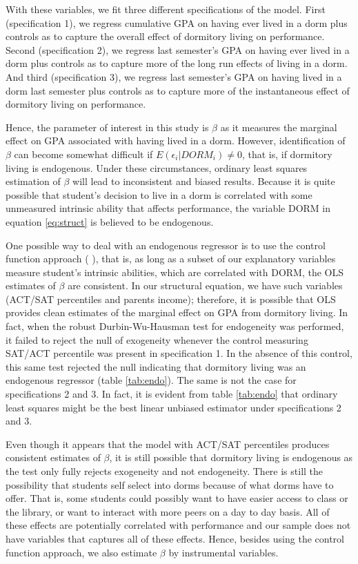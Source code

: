 \documentclass[12pt]{article}
\newcommand{\citee}[1]{\citename{#1} \citeyear{#1}}
\begin{document}
With these variables, we fit three different specifications of the model. First (specification 1), we regress cumulative GPA on having ever lived in a dorm plus controls as to capture the overall effect of dormitory living on performance. Second (specification 2), we regress last semester's GPA on having ever lived in a dorm plus controls as to capture more of the long run effects of living in a dorm. And third (specification 3), we regress last semester's GPA on having lived in a dorm last semester plus controls as to capture more of the instantaneous effect of dormitory living on performance.

Hence, the parameter of interest in this study is $\beta$ as it measures the marginal effect on GPA associated with having lived in a dorm. However, identification of $\beta$ can become somewhat difficult if $E(\epsilon_i|DORM_i) \neq 0$, that is, if dormitory living is endogenous. Under these circumstances, ordinary least squares estimation of $\beta$ will lead to inconsistent and biased results. Because it is quite possible that student's decision to live in a dorm is correlated with some unmeasured intrinsic ability that affects performance, the variable DORM in equation \ref{eq:struct} is believed to be endogenous. 

One possible way to deal with an endogenous regressor is to use the control function approach (\citee{trivedi}), that is, as long as a subset of our explanatory variables measure student's intrinsic abilities, which are correlated with DORM, the OLS estimates of $\beta$ are consistent. In our structural equation, we have such variables (ACT/SAT percentiles and parents income); therefore, it is possible that OLS provides clean estimates of the marginal effect on GPA from dormitory living. In fact, when the robust Durbin-Wu-Hausman test for endogeneity was performed, it failed to reject the null of exogeneity whenever the control measuring SAT/ACT percentile was present in specification 1. In the absence of this control, this same test rejected the null indicating that dormitory living was an endogenous regressor (table \ref{tab:endo}). The same is not the case for specifications 2 and 3. In fact, it is evident from table \ref{tab:endo} that ordinary least squares might be the best linear unbiased estimator under specifications 2 and 3.

Even though it appears that the model with ACT/SAT percentiles produces consistent estimates of $\beta$, it is still possible that dormitory living is endogenous as the test only fully rejects exogeneity and not endogeneity. There is still the possibility that students self select into dorms because of what dorms have to offer. That is, some students could possibly want to have easier access to class or the library, or want to interact with more peers on a day to day basis. All of these effects are potentially correlated with performance and our sample does not have variables that captures all of these effects. Hence, besides using the control function approach, we also estimate $\beta$ by instrumental variables. 
\end{document}
